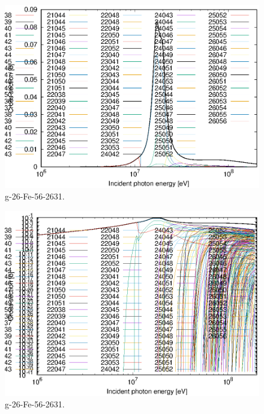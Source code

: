 \begin{figure}
 \includegraphics[width=\linewidth]{eps/g_26-Fe-56_2631.eps}
  \caption{g-26-Fe-56-2631.}
\end{figure}
\begin{figure}
 \includegraphics[width=\linewidth]{eps-log/g_26-Fe-56_2631.eps}
 \caption{g-26-Fe-56-2631.}
\end{figure}
\newpage \clearpage

